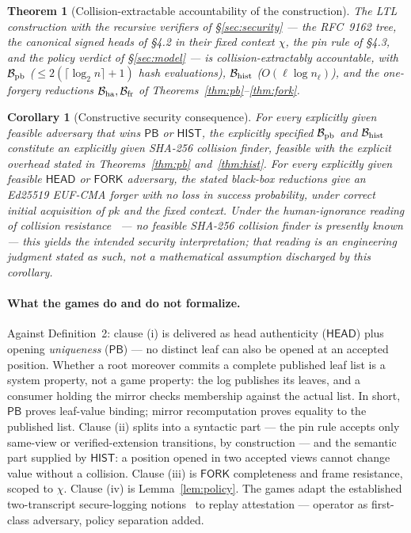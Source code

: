 \documentclass[11pt]{article}
\newtheorem{theorem}{Theorem}
\newtheorem{corollary}{Corollary}
\theoremstyle{remark}
\begin{document}
\begin{theorem}[Collision-extractable accountability of the construction]\label{thm:main}
The LTL construction with the recursive verifiers of \S\ref{sec:security}
--- the RFC~9162 tree, the canonical signed heads of \S4.2 in their fixed context $\chi$, the pin rule of \S4.3, and the policy
verdict of \S\ref{sec:model} --- is collision-extractably accountable, with
$\mathcal{B}_{\rm pb}$ ($\le 2(\lceil\log_2 n\rceil{+}1)$ hash evaluations),
$\mathcal{B}_{\rm hist}$ ($O(\ell\log n_\ell)$), and the one-forgery reductions
$\mathcal{B}_{\rm ha},\mathcal{B}_{\rm fr}$ of
Theorems~\ref{thm:pb}--\ref{thm:fork}.
\end{theorem}

\begin{corollary}[Constructive security consequence]\label{cor:security}
For every explicitly given feasible adversary that wins $\mathsf{PB}$ or
$\mathsf{HIST}$, the explicitly specified $\mathcal{B}_{\rm pb}$ and
$\mathcal{B}_{\rm hist}$ constitute an explicitly given SHA-256 collision
finder, feasible with the explicit overhead stated in
Theorems~\ref{thm:pb} and~\ref{thm:hist}. For every explicitly given
feasible $\mathsf{HEAD}$ or $\mathsf{FORK}$ adversary, the stated black-box
reductions give an Ed25519 EUF-CMA forger with no loss in success
probability, under correct initial acquisition of $pk$ and the fixed context.
Under the human-ignorance reading of collision resistance~\cite{rogaway} ---
no feasible SHA-256 collision finder is presently known --- this yields the
intended security interpretation; that reading is an engineering judgment
stated as such, not a mathematical assumption discharged by this corollary.
\end{corollary}

\paragraph{What the games do and do not formalize.}
Against Definition~2: clause (i) is delivered as head authenticity
($\mathsf{HEAD}$) plus opening \emph{uniqueness} ($\mathsf{PB}$) --- no
distinct leaf can also be opened at an accepted position. Whether a root
moreover commits a complete published leaf list is a system property, not a
game property: the log publishes its leaves, and a consumer holding the
mirror checks membership against the actual list. In short,
$\mathsf{PB}$ proves leaf-value binding; mirror recomputation proves
equality to the published list. Clause (ii) splits into a
syntactic part --- the pin rule accepts only same-view or verified-extension
transitions, by construction --- and the semantic part supplied by
$\mathsf{HIST}$: a position opened in two accepted views cannot change value
without a collision. Clause (iii) is $\mathsf{FORK}$ completeness and frame
resistance, scoped to $\chi$. Clause (iv) is Lemma~\ref{lem:policy}. The games adapt the established
two-transcript secure-logging notions~\cite{dghs} to replay attestation ---
operator as first-class adversary, policy separation added.
\end{document}
